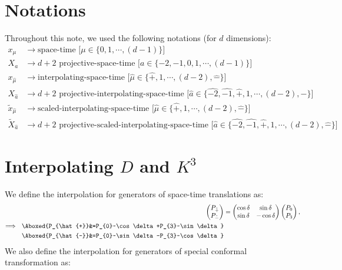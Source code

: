\documentclass[]{article}
\numberwithin{equation}{section}
\begin{document}
{{\section{Notations}
Throughout this note, we used the following notations (for $d$ dimensions):
\begin{align}
    x_{\mu}&\longrightarrow\text{space-time  [$\mu\in\{0,1,\cdots,(d-1)\}$]}\\
    X_{a}&\longrightarrow\text{$d+2$ projective-space-time  [$a\in\{-2,-1,0,1,\cdots,(d-1)\}$]}\\
    x_{\hat{\mu}}&\longrightarrow\text{interpolating-space-time  [$\hat{\mu}\in\{\hat{+},1,\cdots,(d-2),\hat{-}\}$]}\\
    X_{\hat{a}}&\longrightarrow\text{$d+2$ projective-interpolating-space-time  [$\hat{a}\in\{\hat{-2},\hat{-1},\hat{+},1,\cdots,(d-2),\hat{-}\}$]}\\
    \tilde{x}_{\hat{\mu}}&\longrightarrow\text{scaled-interpolating-space-time  [$\hat{\mu}\in\{\hat{+},1,\cdots,(d-2),\hat{-}\}$]}\\
    \tilde{X}_{\hat{a}}&\longrightarrow\text{$d+2$ projective-scaled-interpolating-space-time  [$\hat{a}\in\{\hat{-2},\hat{-1},\hat{+},1,\cdots,(d-2),\hat{-}\}$]}
\end{align}
\section{Interpolating $D$ and $K^{3}$}
We define the interpolation for generators of space-time translations as:
\begin{align}
\begin{pmatrix}
    P_{\hat{+}}\\
    P_{\hat{-}}
  \end{pmatrix}&=
  \begin{pmatrix}
    \cos\delta   & \sin\delta \\
    \sin\delta   & -\cos\delta
  \end{pmatrix}
  \begin{pmatrix}
    P_{0}\\
    P_{3}
  \end{pmatrix},\\
\Longrightarrow~~\Aboxed{P_{\hat{+}}&=P_{0}~\cos\delta+P_{3}~\sin\delta}\\
\Aboxed{P_{\hat{-}}&=P_{0}~\sin\delta-P_{3}~\cos\delta}
\end{align}
We also define the interpolation for generators of special conformal transformation as:

}}
\end{document}
